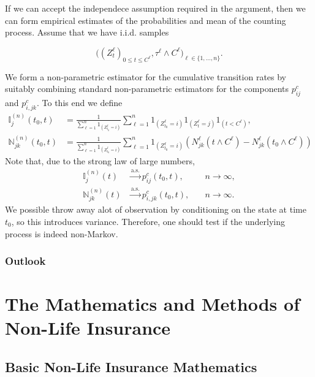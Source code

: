 \documentclass[a4paper,10pt,openany]{book}
\begin{document}
If we can accept the independece assumption required in the argument, then we can form empirical estimates of the probabilities and mean of the counting process. Assume that we have i.i.d. samples

\[
\Big((Z_t^\ell)_{0\le t\le C^\ell}, \tau^\ell \wedge C^\ell\Big)_{\ell\in \{1,...,n\}}.
\]

We form a non-parametric estimator for the cumulative transition rates by suitably combining standard non-parametric estimators for the components \(p^c_{ij}\) and \(p^c_{i,jk}\). To this end we define
\begin{align*}
\mathbb I_{j}^{(n)}(t_0,t)&=\frac{1}{\sum_{\ell = 1}^n 1_{(Z^\ell_{t_0}=i)}}\sum_{\ell = 1}^n 1_{(Z^\ell_{t_0}=i)}1_{(Z_t^\ell = j)}1_{(t<C^\ell)},\\
\mathbb N_{jk}^{(n)}(t_0,t)&=\frac{1}{\sum_{\ell = 1}^n 1_{(Z^\ell_{t_0}=i)}}\sum_{\ell = 1}^n 1_{(Z^\ell_{t_0}=i)}\left(N_{jk}^\ell(t\wedge C^\ell)-N_{jk}^\ell(t_0\wedge C^\ell)\right)
\end{align*}
Note that, due to the strong law of large numbers,
\begin{align*}
\mathbb I_{j}^{(n)}(t)&\stackrel{\text{a.s.}}{\to}p_{ij}^c(t_0,t),&\quad n\to\infty,\\
\mathbb N_{jk}^{(n)}(t)&\stackrel{\text{a.s.}}{\to}p_{i,jk}^c(t_0,t),&\quad n\to\infty.
\end{align*}
We possible throw away alot of observation by conditioning on the state at time \(t_0\), so this introduces variance. Therefore, one should test if the underlying process is indeed non-Markov.

\hypertarget{outlook}{%
\section{Outlook}\label{outlook}}

\hypertarget{part-the-mathematics-and-methods-of-non-life-insurance}{%
\part{The Mathematics and Methods of Non-Life Insurance}\label{part-the-mathematics-and-methods-of-non-life-insurance}}

\hypertarget{basic-non-life-insurance-mathematics}{%
\chapter{Basic Non-Life Insurance Mathematics}\label{basic-non-life-insurance-mathematics}}
\end{document}
